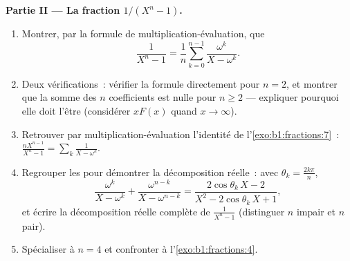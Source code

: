 \begin{problem}
\medskip
\noindent\textbf{Partie II --- La fraction $1/(X^n - 1)$.}
\begin{enumerate}[resume]
  \item Montrer, par la formule de multiplication-évaluation, que
        \[
        \frac{1}{X^n - 1}
        = \frac1n\sum_{k=0}^{n-1}\frac{\omega^k}{X - \omega^k} .
        \]
  \item Deux vérifications~: vérifier la formule directement pour $n =
        2$, et montrer que la somme des $n$ coefficients est nulle pour
        $n \geq 2$ --- expliquer pourquoi elle doit l'être (considérer
        $xF(x)$ quand $x \to \infty$).
  \item Retrouver par multiplication-évaluation l'identité de
        l'\cref{exo:b1:fractions:7}~:
        $\frac{nX^{n-1}}{X^n-1} = \sum_k \frac1{X - \omega^k}$.
  \item Regrouper les   pour démontrer la décomposition
        réelle~: avec $\theta_k = \frac{2k\pi}n$,
        \[
        \frac{\omega^k}{X - \omega^k} +
        \frac{\omega^{n-k}}{X - \omega^{n-k}}
        = \frac{2\cos\theta_k\,X - 2}
        {X^2 - 2\cos\theta_k\,X + 1} ,
        \]
        et écrire la décomposition réelle complète de
        $\frac1{X^n-1}$ (distinguer $n$ impair et $n$ pair).
  \item Spécialiser à $n = 4$ et confronter à
        l'\cref{exo:b1:fractions:4}.
\end{enumerate}


\end{problem}
